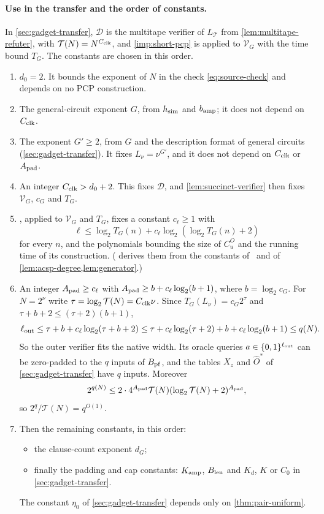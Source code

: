 \documentclass[11pt,letterpaper]{article}
\theoremstyle{definition}
\theoremstyle{remark}
\newcommand{\lgx}{\log_2}
\newcommand{\Tclk}{\mathcal T}
\begin{document}
\paragraph{Use in the transfer and the order of constants.} In
\cref{sec:gadget-transfer}, \(\mathcal D\) is the
multitape verifier of \(L_{\Tclk}\) from \cref{lem:multitape-refuter},
with \(\Tclk(N)=N^{C_{\rm clk}}\), and \cref{imp:short-pcp} is applied to
\(\mathcal V_G\) with the time bound \(T_G\). The constants are chosen
in this order.
\begin{enumerate}
\item \(d_0=2\). It
bounds the exponent of \(N\) in the check \eqref{eq:source-check} and
depends on no PCP construction.
\item The general-circuit exponent \(G\), from \(h_{\rm sim}\) and
\(b_{\rm amp}\); it does not depend on \(C_{\rm clk}\).
\item The exponent \(G'\ge2\), from \(G\) and the description format of
general circuits (\cref{sec:gadget-transfer}). It fixes
\(L_\nu=\nu^{G'}\), and it does not depend on \(C_{\rm clk}\) or
\(A_{\rm pad}\).
\item An integer \(C_{\rm clk}>d_0+2\). This fixes \(\mathcal D\), and
\cref{lem:succinct-verifier} then fixes \(\mathcal V_G\), \(c_G\) and
\(T_G\).
\item {}, applied to \(\mathcal V_G\) and \(T_G\), fixes
a constant \(c_\ell\ge1\) with
\[
 \ell\le\lgx T_G(n)+c_\ell\lgx(\lgx T_G(n)+2)
\]
for every \(n\), and the polynomials bounding the size of \(C^O_u\) and
the running time of its construction. ( derives
them from the constants of~\cite{BCGT13} and of
\cref{lem:acsp-degree,lem:generator}.)
\item An integer \(A_{\rm pad}\ge c_\ell\) with
\(A_{\rm pad}\ge b+c_\ell\lgx(b+1)\), where \(b=\lgx c_G\). For
\(N=2^\nu\) write \(\tau=\lgx\Tclk(N)=C_{\rm clk}\nu\). Since
\(T_G(L_\nu)=c_G2^\tau\) and \(\tau+b+2\le(\tau+2)(b+1)\),
\[
 \ell_{\rm out}\le\tau+b+c_\ell\lgx(\tau+b+2)
 \le\tau+c_\ell\lgx(\tau+2)+b+c_\ell\lgx(b+1)\le q(N).
\]
So the outer verifier fits the native width. Its oracle queries
\(a\in\{0,1\}^{\ell_{\rm out}}\) can be zero-padded to the \(q\)
inputs of \(B_{\rm pf}\), and the tables \(X_z\) and
\(\widehat O^*\) of \cref{sec:gadget-transfer} have
\(q\) inputs. Moreover
\[
 2^{q(N)}\le2\cdot4^{A_{\rm pad}}\Tclk(N)(\lgx\Tclk(N)+2)^{A_{\rm pad}},
\]
so \(2^q/\Tclk(N)=q^{O(1)}\).
\item Then the remaining constants, in this order:
\begin{itemize}
\item the clause-count exponent \(d_G\);
\item finally the padding and cap constants: \(K_{\rm amp}\),
\(B_{\rm len}\) and \(K_d\), \(K\) or \(C_0\) in
\cref{sec:gadget-transfer}.
\end{itemize}
The constant \(\eta_0\) of \cref{sec:gadget-transfer} depends only on
\cref{thm:pair-uniform}.
\end{enumerate}
\end{document}
